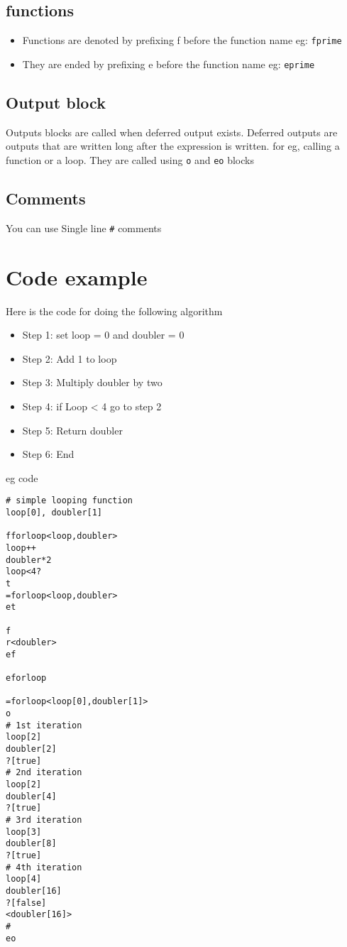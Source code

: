 \documentclass[11pt]{article}
\begin{document}
\subsection{functions}
\label{sec:org9aac404}

\begin{itemize}
\item Functions are denoted by prefixing f before the function name eg: \texttt{fprime}
\item They are ended by prefixing e before the function name eg: \texttt{eprime}
\end{itemize}

\subsection{Output block}
\label{sec:orgd7a7f6e}

Outputs blocks are called when deferred output exists. Deferred outputs are outputs that are written long after the expression is written. for eg, calling a function or a loop.
They are called using \texttt{o} and \texttt{eo} blocks 

\subsection{Comments}
\label{sec:org4f3fdf3}

You can use Single line \texttt{\#} comments

\section{Code example}
\label{sec:orgaf3b3b1}

Here is the code for doing the following algorithm

\begin{itemize}
\item Step 1: set loop = 0 and doubler = 0
\item Step 2: Add 1 to loop
\item Step 3: Multiply doubler by two
\item Step 4: if Loop < 4 go to step 2
\item Step 5: Return doubler
\item Step 6: End
\end{itemize}

eg code
\begin{verbatim}
# simple looping function
loop[0], doubler[1]

fforloop<loop,doubler>
loop++
doubler*2
loop<4?
t
=forloop<loop,doubler>
et

f
r<doubler>
ef

eforloop

=forloop<loop[0],doubler[1]>
o
# 1st iteration
loop[2]
doubler[2]
?[true]
# 2nd iteration
loop[2]
doubler[4]
?[true]
# 3rd iteration
loop[3]
doubler[8]
?[true]
# 4th iteration
loop[4]
doubler[16]
?[false]
<doubler[16]>
# 
eo

\end{verbatim}
\end{document}

